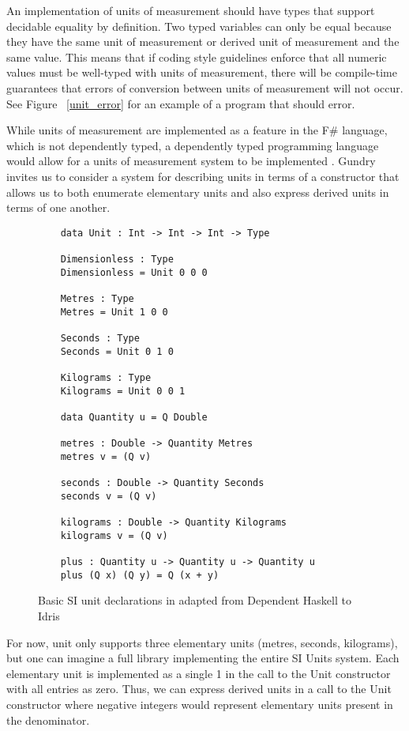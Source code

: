 An implementation of units of measurement should have types that support
decidable equality by definition. Two typed variables can only be equal because
they have the same unit of measurement or derived unit of measurement and the
same value. This means that if coding style guidelines enforce that all numeric
values must be well-typed with units of measurement, there will be compile-time
guarantees that errors of conversion between units of measurement will not
occur. See Figure ~\ref{unit_error} for an example of a program that should
error. 

While units of measurement are implemented as a feature in the F\# language,
which is not dependently typed, a dependently typed programming language would
allow for a units of measurement system to be implemented \cite{gundry2013}.
Gundry invites us to consider a system for describing units in terms of a
constructor that allows us to both enumerate elementary units and also express
derived units in terms of one another. 

\begin{figure}[ht!]
  \label{idris_code}
  \caption{Basic SI unit declarations in adapted from Dependent Haskell to Idris \cite{gundry2013}}
  \begin{lstlisting}
    data Unit : Int -> Int -> Int -> Type
    
    Dimensionless : Type
    Dimensionless = Unit 0 0 0
    
    Metres : Type
    Metres = Unit 1 0 0
    
    Seconds : Type
    Seconds = Unit 0 1 0
    
    Kilograms : Type
    Kilograms = Unit 0 0 1
    
    data Quantity u = Q Double
    
    metres : Double -> Quantity Metres
    metres v = (Q v)
    
    seconds : Double -> Quantity Seconds
    seconds v = (Q v)
    
    kilograms : Double -> Quantity Kilograms
    kilograms v = (Q v)
    
    plus : Quantity u -> Quantity u -> Quantity u
    plus (Q x) (Q y) = Q (x + y)
  \end{lstlisting}
\end{figure}

For now, unit only supports three elementary units (metres, seconds, kilograms),
but one can imagine a full library implementing the entire SI Units system. Each
elementary unit is implemented as a single 1 in the call to the Unit constructor
with all entries as zero. Thus, we can express derived units in a call to the
Unit constructor where negative integers would represent elementary units
present in the denominator. 

